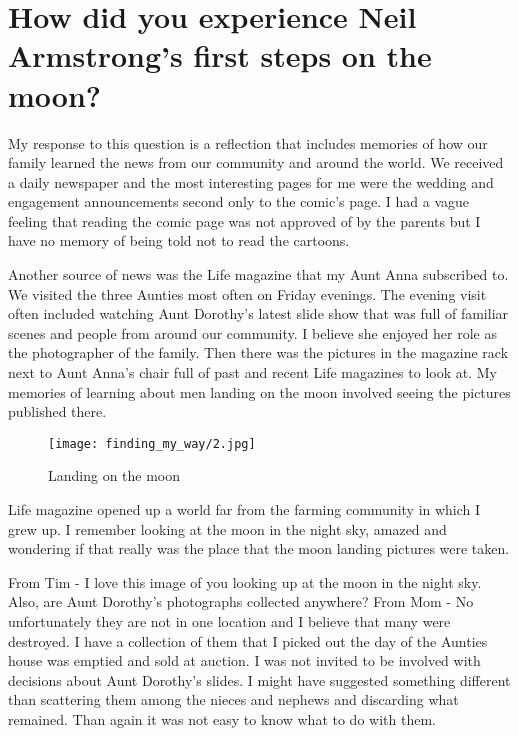 \section{How did you experience Neil Armstrong's first steps on the moon?}
My response to this question is a reflection that includes memories of how our family learned the news from our community and around the world.
We received a daily newspaper and the most interesting pages for me were the wedding and engagement announcements second only to the comic's page.
I had a vague feeling that reading the comic page was not approved of by the parents but I have no memory of being told not to read the cartoons.

Another source of news was the Life magazine that my Aunt Anna subscribed to.
We visited the three Aunties most often on Friday evenings.
The evening visit often included watching Aunt Dorothy's latest slide show that was full of familiar scenes and people from around our community.
I believe she enjoyed her role as the photographer of the family.
Then there was the pictures in the magazine rack next to Aunt Anna's chair full of past and recent Life magazines to look at.
My memories of learning about men landing on the moon involved seeing the pictures published there.
\begin{figure}
\centering
\texttt{[image: finding\_my\_way/2.jpg]}
\caption{
Landing on the moon
}
\end{figure}

Life magazine opened up a world far from the farming community in which I grew up.
I remember looking at the moon in the night sky, amazed and wondering if that really was the place that the moon landing pictures were taken.

From Tim - I love this image of you looking up at the moon in the night sky.
Also, are Aunt Dorothy's photographs collected anywhere?
From Mom - No unfortunately they are not in one location and I believe that many were destroyed.
I have a collection of them that I picked out the day of the Aunties house was emptied and sold at auction.
I was not invited to be involved with decisions about Aunt Dorothy's slides.
I might have suggested something different than scattering them among the nieces and nephews and discarding what remained.
Than again it was not easy to know what to do with them.






